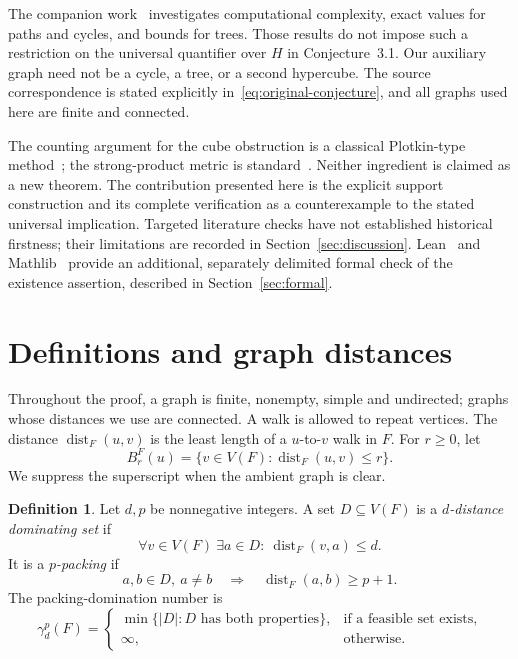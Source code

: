 \documentclass[11pt]{article}
\theoremstyle{definition}
\newtheorem{definition}[theorem]{Definition}
\theoremstyle{remark}
\newcommand{\dist}{\operatorname{dist}}
\begin{document}
The companion work~\cite{bickz-complexity} investigates computational
complexity, exact values for paths and cycles, and bounds for trees.
Those results do not impose
such a restriction on the universal quantifier over \(H\) in
Conjecture~3.1. Our auxiliary graph need not be a cycle, a tree,
or a second hypercube. The source correspondence is stated explicitly
in~\eqref{eq:original-conjecture}, and all graphs used here are finite
and connected.

The counting argument for the cube obstruction is a classical
Plotkin-type method~\cite{plotkin}; the strong-product metric is
standard~\cite{handbook}. Neither ingredient is claimed as a new
theorem. The contribution presented here is the explicit support
construction and its complete verification as a counterexample to
the stated universal implication. Targeted literature checks have
not established historical firstness; their limitations are recorded
in Section~\ref{sec:discussion}. Lean~\cite{lean4} and
Mathlib~\cite{mathlib} provide an additional, separately delimited
formal check of the existence assertion, described in
Section~\ref{sec:formal}.

\section{Definitions and graph distances}\label{sec:preliminaries}
Throughout the proof, a graph is finite, nonempty, simple and undirected;
graphs whose distances we use are connected. A walk is allowed to
repeat vertices. The distance \(\dist_F(u,v)\) is the least length of
a \(u\)-to-\(v\) walk in \(F\). For \(r\ge0\), let
\[
 B_r^F(u)=\{v\in V(F):\dist_F(u,v)\le r\}.
\]
We suppress the superscript when the ambient graph is clear.

\begin{definition}\label{def:packing-domination}
Let \(d,p\) be nonnegative integers. A set \(D\subseteq V(F)\) is a
\emph{\(d\)-distance dominating set} if
\[
 \forall v\in V(F)\ \exists a\in D:\ \dist_F(v,a)\le d.
\]
It is a \emph{\(p\)-packing} if
\[
 a,b\in D,\ a\ne b\quad\Longrightarrow\quad \dist_F(a,b)\ge p+1.
\]
The packing-domination number is
\[
 \gamma_d^p(F)=
 \begin{cases}
 \min\{|D|:D\text{ has both properties}\},&
       \text{if a feasible set exists},\\
 \infty,&\text{otherwise}.
 \end{cases}
\]
\end{definition}
\end{document}
